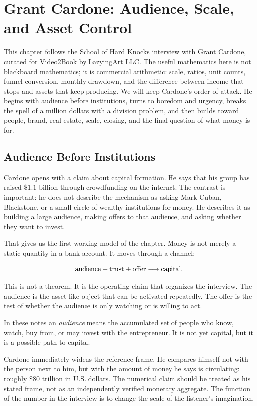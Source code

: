 \chapter{Grant Cardone: Audience, Scale, and Asset Control}

This chapter follows the School of Hard Knocks interview with Grant Cardone, curated for Video2Book by LazyingArt LLC. The useful mathematics here is not blackboard mathematics; it is commercial arithmetic: scale, ratios, unit counts, funnel conversion, monthly drawdown, and the difference between income that stops and assets that keep producing. We will keep Cardone's order of attack. He begins with audience before institutions, turns to boredom and urgency, breaks the spell of a million dollars with a division problem, and then builds toward people, brand, real estate, scale, closing, and the final question of what money is for.

\section{Audience Before Institutions}

Cardone opens with a claim about capital formation. He says that his group has raised \(\$1.1\) billion through crowdfunding on the internet. The contrast is important: he does not describe the mechanism as asking Mark Cuban, Blackstone, or a small circle of wealthy institutions for money. He describes it as building a large audience, making offers to that audience, and asking whether they want to invest.

That gives us the first working model of the chapter. Money is not merely a static quantity in a bank account. It moves through a channel:

\[
\hbox{audience}+\hbox{trust}+\hbox{offer} \longrightarrow \hbox{capital}.
\]

This is not a theorem. It is the operating claim that organizes the interview. The audience is the asset-like object that can be activated repeatedly. The offer is the test of whether the audience is only watching or is willing to act.

\begin{definition}
In these notes an \emph{audience} means the accumulated set of people who know, watch, buy from, or may invest with the entrepreneur. It is not yet capital, but it is a possible path to capital.
\end{definition}

Cardone immediately widens the reference frame. He compares himself not with the person next to him, but with the amount of money he says is circulating: roughly \(\$80\) trillion in U.S. dollars. The numerical claim should be treated as his stated frame, not as an independently verified monetary aggregate. The function of the number in the interview is to change the scale of the listener's imagination.

